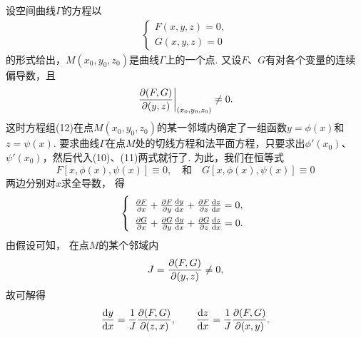 设空间曲线\(\Gamma\)的方程以\begin{gather}
\left\{ \begin{array}{l}
F(x,y,z)=0, \\
G(x,y,z)=0
\end{array} \right.
\tag{12}
\end{gather}的形式给出，\(M(x_0,y_0,z_0)\)是曲线\(\Gamma\)上的一个点.
又设\(F\)、\(G\)有对各个变量的连续偏导数，且\[
\eval{\jacobi{F,G}{y,z}}_{(x_0,y_0,z_0)} \neq 0.
\]这时方程组(12)在点\(M(x_0,y_0,z_0)\)的某一邻域内确定了一组函数\(y=\phi(x)\)和\(z=\psi(x)\).
要求曲线\(\Gamma\)在点\(M\)处的切线方程和法平面方程，只要求出\(\phi'(x_0)\)、\(\psi'(x_0)\)，然后代入(10)、(11)两式就行了.
为此，我们在恒等式\[
	F[x,\phi(x),\psi(x)] \equiv 0,
	\quad\text{和}\quad
	G[x,\phi(x),\psi(x)] \equiv 0
\]两边分别对\(x\)求全导数，
得\[
	\left\{ \def\arraystretch{1.5} \begin{array}{l}
		\pdv{F}{x} + \pdv{F}{y} \dv{y}{x} + \pdv{F}{z} \dv{z}{x} = 0, \\
		\pdv{G}{x} + \pdv{G}{y} \dv{y}{x} + \pdv{G}{z} \dv{z}{x} = 0.
	\end{array} \right.
\]
由假设可知，
在点\(M\)的某个邻域内\[
	J = \pdv{ (F,G) }{ (y,z) } \neq 0,
\]
故可解得\[
	\dv{y}{x} = \frac{1}{J} \pdv{ (F,G) }{ (z,x) },
	\qquad
	\dv{z}{x} = \frac{1}{J} \pdv{ (F,G) }{ (x,y) }.
\]

